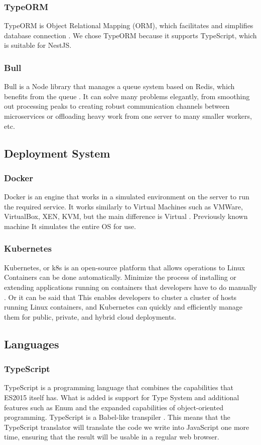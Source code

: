 \documentclass[12pt,oneside,openright,a4paper]{cpe-english-project}
\begin{document}
\subsubsection{TypeORM}
TypeORM is Object Relational Mapping (ORM), which facilitates and simplifies database connection \cite{typeorm}.
We chose TypeORM because it supports TypeScript, which is suitable for NestJS.

\subsubsection{Bull}
Bull is a Node library that manages a queue system based on Redis, which benefits from the queue
\cite{job_queue_management_bull}. It can solve many problems elegantly, from smoothing out processing peaks to creating
robust communication channels between microservices or offloading heavy work from one server to
many smaller workers, etc.

\subsection{Deployment System}
\subsubsection{Docker}
Docker is an engine that works in a simulated environment on the server to run the required service.
It works similarly to Virtual Machines such as VMWare, VirtualBox, XEN, KVM, but the main difference
is Virtual \cite{what_is_docker}. Previously known machine It simulates the entire OS for use.

\subsubsection{Kubernetes}
Kubernetes, or k8s is an open-source platform that allows operations to Linux Containers
can be done automatically. Minimize the process of installing or extending applications
running on containers that developers have to do manually \cite{explain_kubernetes}. Or
it can be said that This enables developers to cluster a cluster of hosts
running Linux containers, and Kubernetes can quickly and efficiently manage them
for public, private, and hybrid cloud deployments.

\subsection{Languages}
\subsubsection{TypeScript}
TypeScript is a programming language that combines the capabilities that ES2015 itself has.
What is added is support for Type System and additional features such as Enum and the expanded
capabilities of object-oriented programming. TypeScript is a Babel-like transpiler \cite{what_is_ts}.
This means that the TypeScript translator will translate the code we write into JavaScript one more
time, ensuring that the result will be usable in a regular web browser.
\end{document}
